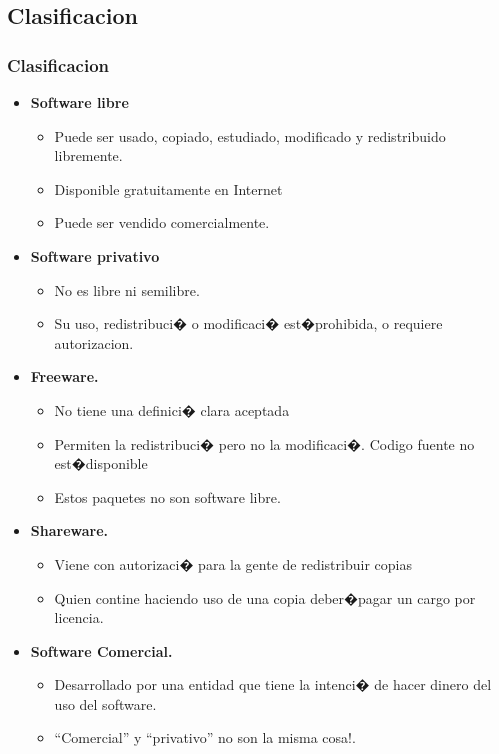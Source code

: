 \subsection{Clasificacion}
\frame
{
        \frametitle{Clasificacion}
        \begin{itemize}
     	\item \textbf{Software libre}
		\begin{itemize}
		\item Puede ser usado, copiado, estudiado, modificado y redistribuido libremente.
		\item Disponible gratuitamente en Internet
		\item Puede ser vendido comercialmente.
		\end{itemize}
	\item \textbf{Software privativo}
		\begin{itemize}
		\item  No es libre ni semilibre. 
		\item Su uso, redistribuci� o modificaci� est�prohibida, o requiere autorizacion.
		\end{itemize}
	\item \textbf{Freeware.}
		\begin{itemize}
		\item  No tiene una definici� clara aceptada
		\item Permiten la redistribuci� pero no la modificaci�. Codigo fuente no est�disponible
		\item Estos paquetes no son software libre.
		\end{itemize}
	\item \textbf{Shareware.}
		\begin{itemize}
		\item  Viene con autorizaci� para la gente de redistribuir copias
		\item Quien contine haciendo uso de una copia deber�pagar un cargo por licencia.
		\end{itemize}
	\item \textbf{Software Comercial.}
		\begin{itemize}
		\item  Desarrollado por una entidad que tiene la intenci� de hacer dinero del uso del software. 
		\item ``Comercial'' y ``privativo'' no son la misma cosa!.
		\end{itemize}
        \end{itemize}
}
